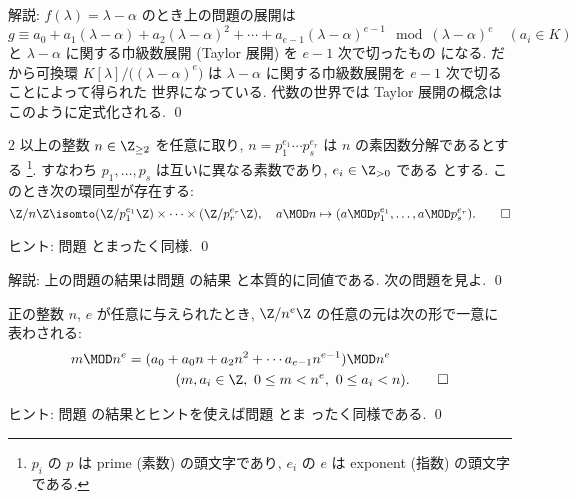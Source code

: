 \documentclass[12pt,twoside]{jarticle}
\begin{document}
\medskip
\noindent
解説: $f(\lambda)=\lambda-\alpha$ のとき上の問題の展開は
\begin{equation*}
  g \equiv
  a_0 + a_1(\lambda-\alpha) + a_2(\lambda-\alpha)^2 
  + \cdots + a_{e-1}(\lambda-\alpha)^{e-1}
  \mod (\lambda-\alpha)^e
  \quad (a_i\in K)
\end{equation*}
と $\lambda-\alpha$ に関する巾級数展開 (Taylor 展開) を $e-1$ 次で切ったもの
になる.  だから可換環 $K[\lambda]/\bigl((\lambda-\alpha)^e\bigr)$ 
は $\lambda-\alpha$ に関する巾級数展開を $e-1$ 次で切ることによって得られた
世界になっている.  代数の世界では Taylor 展開の概念はこのように定式化される.
\qed


\begin{question}
\label{q:Chinese-remainder-Z}
  $2$ 以上の整数 $n\in\Z_{\ge2}$ を任意に取り, 
  $n=p_1^{e_1}\cdots p_s^{e_r}$ は $n$ の素因数分解であるとする%
  \footnote{$p_i$ の $p$ は prime (素数) の頭文字であり,
    $e_i$ の $e$ は exponent (指数) の頭文字である.}.
  すなわち $p_1,\dots,p_s$ は互いに異なる素数であり, $e_i\in\Z_{>0}$ である
  とする.  このとき次の環同型が存在する:
  \begin{equation*}
    \Z/n\Z \isomto (\Z/p_1^{e_1}\Z)\times\cdots\times(\Z/p_r^{e_r}\Z),
    \quad
    a\MOD n \mapsto (a\MOD p_1^{e_1},\dots,a\MOD p_s^{e_r}).
    \qed
  \end{equation*}
\end{question}

\noindent
ヒント: 問題  とまったく同様.
\qed

\medskip
\noindent
解説: 上の問題の結果は問題  の結果
と本質的に同値である.  次の問題を見よ.
\qed


\begin{question}[$n$ 進展開]
\label{q:n-adic}
  正の整数 $n$, $e$ が任意に与えられたとき, 
  $\Z/n^e\Z$ の任意の元は次の形で一意に表わされる:
  \begin{align*}
    &
    m\MOD n^e 
    = (a_0 + a_0 n + a_2 n^2 + \cdots a_{e-1} n^{e-1})\MOD n^e
    \\ &
    \hphantom{
    m\MOD n^e 
    = (a_0 +
    }
    (m,a_i\in\Z,\ 0\le m<n^e,\ 0\le a_i<n).
    \qed
  \end{align*}
\end{question}

\noindent
ヒント: 問題  の結果とヒントを使えば問題  とま
ったく同様である. 
\qed
\end{document}
